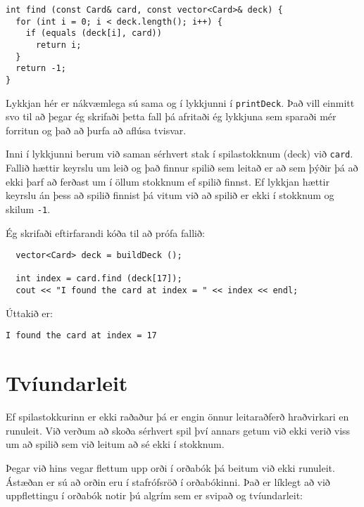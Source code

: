\begin{verbatim}
int find (const Card& card, const vector<Card>& deck) {
  for (int i = 0; i < deck.length(); i++) {
    if (equals (deck[i], card)) 
      return i;
  }
  return -1;
}
\end{verbatim}
%
Lykkjan hér er nákvæmlega sú sama og í lykkjunni í {\tt printDeck}.
Það vill einmitt svo til að þegar ég skrifaði þetta fall þá afritaði ég lykkjuna sem sparaði mér forritun
og það að þurfa að aflúsa tvisvar.

Inni í lykkjunni berum við saman sérhvert stak í spilastokknum (deck) við {\tt card}.
Fallið hættir keyrslu um leið og það finnur spilið sem leitað er að sem þýðir þá að ekki þarf að ferðast um
í öllum stokknum ef spilið finnst.
Ef lykkjan hættir keyrslu án þess að spilið finnist þá vitum við að spilið er ekki í stokknum og skilum {\tt -1}.


Ég skrifaði eftirfarandi kóða til að prófa fallið: 

\begin{verbatim}
  vector<Card> deck = buildDeck ();

  int index = card.find (deck[17]);
  cout << "I found the card at index = " << index << endl;
\end{verbatim}
%
Úttakið er:
\begin{verbatim}
I found the card at index = 17
\end{verbatim}
%

\section{Tvíundarleit}

Ef spilastokkurinn er ekki raðaður þá er engin önnur leitaraðferð hraðvirkari en runuleit.
Við verðum að skoða sérhvert spil því annars getum við ekki verið viss um að spilið sem við leitum að sé ekki í stokknum.

Þegar við hins vegar flettum upp orði í orðabók þá beitum við ekki runuleit.
Ástæðan er sú að orðin eru í stafrófsröð í orðabókinni.
Það er líklegt að við uppflettingu í orðabók notir þú algrím sem er svipað og tvíundarleit:

